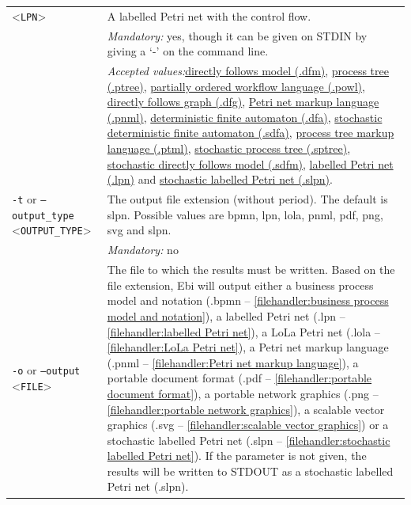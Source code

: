 {\begin{tabularx}{\linewidth}{lX}
<\texttt{LPN}>&A labelled Petri net with the control flow.\\
&\textit{Mandatory:} \quad yes, though it can be given on STDIN by giving a `-' on the command line.\\
&\textit{Accepted values:}\quad \hyperref[filehandler:directly follows model]{directly follows model (.dfm)}, \hyperref[filehandler:process tree]{process tree (.ptree)}, \hyperref[filehandler:partially ordered workflow language]{partially ordered workflow language (.powl)}, \hyperref[filehandler:directly follows graph]{directly follows graph (.dfg)}, \hyperref[filehandler:Petri net markup language]{Petri net markup language (.pnml)}, \hyperref[filehandler:deterministic finite automaton]{deterministic finite automaton (.dfa)}, \hyperref[filehandler:stochastic deterministic finite automaton]{stochastic deterministic finite automaton (.sdfa)}, \hyperref[filehandler:process tree markup language]{process tree markup language (.ptml)}, \hyperref[filehandler:stochastic process tree]{stochastic process tree (.sptree)}, \hyperref[filehandler:stochastic directly follows model]{stochastic directly follows model (.sdfm)}, \hyperref[filehandler:labelled Petri net]{labelled Petri net (.lpn)} and \hyperref[filehandler:stochastic labelled Petri net]{stochastic labelled Petri net (.slpn)}.\\
\texttt{-t} or \texttt{--output\_type} <\texttt{OUTPUT\_TYPE}> &
The output file extension (without period). The default is slpn. Possible values are bpmn, lpn, lola, pnml, pdf, png, svg and slpn.\\
&\textit{Mandatory:} \quad no\\
\texttt{-o} or \texttt{--output} <\texttt{FILE}> &
The file to which the results must be written. Based on the file extension, Ebi will output either a business process model and notation (.bpmn -- \cref{filehandler:business process model and notation}), a labelled Petri net (.lpn -- \cref{filehandler:labelled Petri net}), a LoLa Petri net (.lola -- \cref{filehandler:LoLa Petri net}), a Petri net markup language (.pnml -- \cref{filehandler:Petri net markup language}), a portable document format (.pdf -- \cref{filehandler:portable document format}), a portable network graphics (.png -- \cref{filehandler:portable network graphics}), a scalable vector graphics (.svg -- \cref{filehandler:scalable vector graphics}) or a stochastic labelled Petri net (.slpn -- \cref{filehandler:stochastic labelled Petri net}).
If the parameter is not given, the results will be written to STDOUT as a stochastic labelled Petri net (.slpn).\\

\end{tabularx}}
